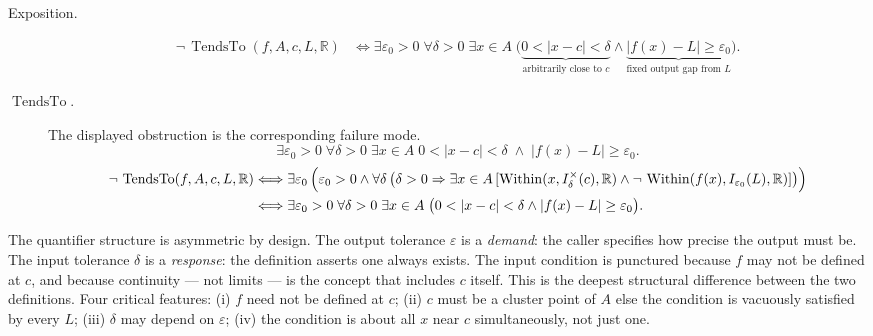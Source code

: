 \begin{remark*}
\begin{description}
  \item[Exposition.]
\[
\begin{aligned}
  \neg\,\operatorname{TendsTo}(f,A,c,L,\mathbb{R})
  &\Longleftrightarrow
  \exists \varepsilon_0>0\;
  \forall \delta>0\;
  \exists x\in A\;
  \bigl(
    \underbrace{0<|x-c|<\delta}_{\text{arbitrarily close to }c}
    \wedge
    \underbrace{|f(x)-L|\geq\varepsilon_0}_{\text{fixed output gap from }L}
  \bigr).
\end{aligned}
\]


  \item[\(\operatorname{TendsTo}.\)]
  The displayed obstruction is the corresponding failure mode.
  \[
\exists\varepsilon_0 > 0\;\forall\delta > 0\;\exists x \in A\;
  0<|x-c|<\delta\;\wedge\; |f(x)-L|\geq\varepsilon_0.
  \]
  \[
\begin{aligned}
  \neg\,\operatorname{TendsTo}(f,A,c,L,\mathbb{R})
  &\Longleftrightarrow
  \exists \varepsilon_0\,
  \Bigl(
    \varepsilon_0>0
    \wedge
    \forall \delta\,
    \bigl(
      \delta>0
      \Rightarrow
      \exists x\in A\,
      [
        \operatorname{Within}(x,I^\times_\delta(c),\mathbb R)
        \wedge
        \neg\,\operatorname{Within}(f(x),I_{\varepsilon_0}(L),\mathbb R)
      ]
    \bigr)
  \Bigr)\\
  &\Longleftrightarrow
  \exists \varepsilon_0>0\;
  \forall \delta>0\;
  \exists x\in A\;
  \bigl(
    0<|x-c|<\delta
    \wedge
    |f(x)-L|\geq\varepsilon_0
  \bigr).
\end{aligned}
  \]
\end{description}
\end{remark*}

\begin{remark*}[Interpretation]
The quantifier structure is asymmetric by design. The output
tolerance $\varepsilon$ is a \emph{demand}: the caller specifies how
precise the output must be. The input tolerance $\delta$ is a
\emph{response}: the definition asserts one always exists. The input
condition is punctured because $f$ may not be defined at $c$, and
because continuity --- not limits --- is the concept that includes $c$
itself. This is the deepest structural difference between the two
definitions. Four critical features: (i) $f$ need not be defined at
$c$; (ii) $c$ must be a cluster point of $A$ else the condition is
vacuously satisfied by every $L$; (iii) $\delta$ may depend on
$\varepsilon$; (iv) the condition is about all $x$ near $c$
simultaneously, not just one.
\end{remark*}

